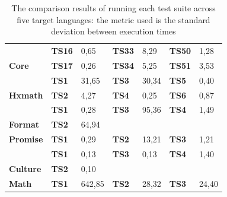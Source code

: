 \begin{table}[h]
{\begin{tabular}{|l|l|l|l|l|l|l|}
		& \textbf{TS16}      & 0,65                             & \textbf{TS33}      & 8,29                          & \textbf{TS50}      & 1,28                           \\ \cline{2-7} 
		\multirow{-17}{*}{\textbf{Core}}   & \textbf{TS17}      & 0,26                             & \textbf{TS34}      & 5,25                          & \textbf{TS51}      & 3,53                           \\ \hline
		& \textbf{TS1}       & 31,65                            & \textbf{TS3}       & 30,34                         & \textbf{TS5}       & 0,40                           \\ \cline{2-7} 
		\multirow{-2}{*}{\textbf{Hxmath}}  & \textbf{TS2}       & 4,27                             & \textbf{TS4}       & 0,25                          & \textbf{TS6}       & 0,87                           \\ \hline
		& \textbf{TS1}       & 0,28                             & \textbf{TS3}       & \cellcolor[HTML]{C0C0C0}95,36 & \textbf{TS4}       & 1,49                           \\ \cline{2-7} 
		\multirow{-2}{*}{\textbf{Format}}  & \textbf{TS2}       & \cellcolor[HTML]{C0C0C0}64,94    & \multicolumn{4}{l|}{\textbf{}}                                                                           \\ \hline
		\textbf{Promise}                   & \textbf{TS1}       & 0,29                             & \textbf{TS2}       & 13,21                         & \textbf{TS3}       & 1,21                           \\ \hline
		& \textbf{TS1}       & 0,13                             & \textbf{TS3}       & 0,13                          & \textbf{TS4}       & 1,40                           \\ \cline{2-7} 
		\multirow{-2}{*}{\textbf{Culture}} & \textbf{TS2}       & 0,10                             & \multicolumn{4}{l|}{}                                                                                    \\ \hline
		\textbf{Math}                      & \textbf{TS1}       & \cellcolor[HTML]{C0C0C0}642,85   & \textbf{TS2}       & 28,32                         & \textbf{TS3}       & 24,40                          \\ \hline
	\end{tabular}%
	}
		\caption{The comparison results of running each test suite across five target languages: the metric used is the standard deviation between execution times  }
		\label{my-label}
\end{table}

